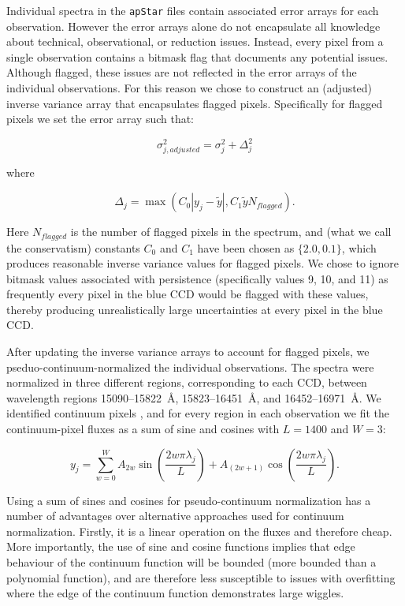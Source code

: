 \documentclass[12pt,preprint]{aastex}
\begin{document}
Individual spectra in the \texttt{apStar} files contain associated error arrays
for each observation. However the error arrays alone do not encapsulate all
knowledge about technical, observational, or reduction issues.  Instead, every
pixel from a single observation contains a bitmask flag that documents any potential issues.  Although flagged, these issues are not reflected in the error
arrays of the individual observations.  For this reason we chose to 
construct an (adjusted) inverse variance array that encapsulates flagged pixels.
Specifically for flagged pixels we set the error array such that:


\begin{equation}
\sigma_{j,adjusted}^2 = \sigma_{j}^2 + \Delta_{j}^2
\end{equation}

\noindent{}where

\begin{equation}
\Delta_{j} = \max{\left(C_{0}|y_{j} - \widetilde{y}|,C_{1}\widetilde{y}N_{flagged}\right)} .
\end{equation}

Here $N_{flagged}$ is the number of flagged pixels in the spectrum, and (what
we call the conservatism) constants $C_0$ and $C_1$ have been chosen as 
$\{2.0,0.1\}$, which produces reasonable inverse variance values for flagged
pixels.  We chose to ignore bitmask values associated with persistence 
(specifically values 9, 10, and 11) as frequently every pixel in the blue CCD
would be flagged with these values, thereby producing unrealistically large 
uncertainties at every pixel in the blue CCD.


After updating the inverse variance arrays to account for flagged pixels, we
pseduo-continuum-normalized the individual observations. The spectra were 
normalized in three different regions, corresponding to each CCD, between
wavelength regions 15090--15822~\AA, 15823--16451~\AA, and 16452--16971~\AA.
We identified continuum pixels 
\citep[following the initial identification in][]{tc}, and for every region in each observation we fit
the continuum-pixel fluxes as a sum of sine and cosines with $L = 1400$ and $W = 3$:


\begin{equation}
y_j = \sum_{w=0}^{W} A_{2w}\sin{\left(\frac{2w\pi\lambda_{j}}{L}\right)} + A_{(2w+1)}\cos{\left(\frac{2w\pi\lambda_{j}}{L}\right)}.
\end{equation}

Using a sum of sines and cosines for pseudo-continuum normalization has a
number of advantages over alternative approaches used for continuum normalization.
Firstly, it is a linear operation on the fluxes and therefore cheap.
More importantly, the use of sine and cosine functions implies that edge behaviour of the
continuum function will be bounded (more bounded than a polynomial
function), and are therefore less susceptible to issues with overfitting 
where the edge of the continuum function demonstrates large wiggles.
\end{document}
